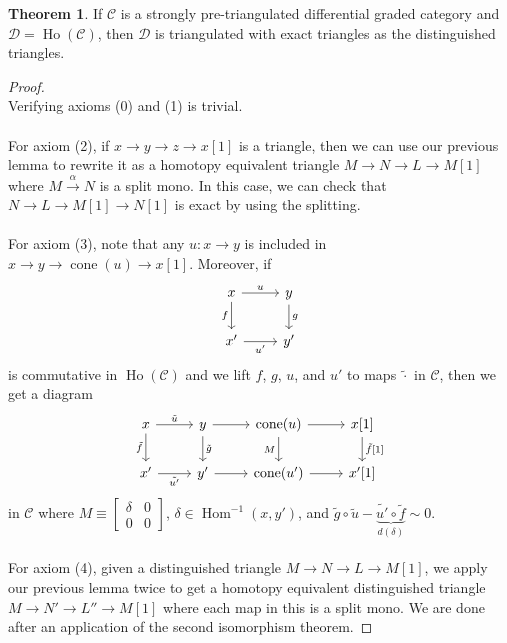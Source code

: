\documentclass[10pt,letterpaper,cm]{nupset}
\theoremstyle{definition}
\newtheorem{theorem}{Theorem}
\newcommand{\1}{\mathbf{1}}
\renewcommand{\c}{\mathscr{C}}
\renewcommand{\d}{\mathscr{D}}
\newcommand{\0}{\vec 0}
\DeclareMathOperator{\Hom}{Hom}
\DeclareMathOperator{\cone}{cone}
\DeclareMathOperator{\ho}{Ho}
\begin{document}
\begin{theorem}
If $\c$ is a strongly pre-triangulated differential graded category and $\d = \ho(\c)$, then $\d$ is triangulated with exact triangles as the distinguished triangles. 
\end{theorem}
\begin{proof} $ $
\\
Verifying axioms (0) and (1) is trivial. 
\\ \\ For axiom (2), if $x \to y \to z \to x[1]$ is a triangle, then we can use our previous lemma to rewrite it as a homotopy equivalent triangle $M \to N \to L \to M[1]$ where $M \overset{\alpha}{\longrightarrow} N$ is a split mono. In this case, we can check that $N \to L \to M[1] \to N[1]$ is exact by using the splitting. 
\\ \\ For axiom (3), note that any $u : x \to y$ is included in $x \to y \to \cone(u) \to x[1]$. Moreover, if
\[
\begin{tikzcd}
x \arrow[r, "u"] \arrow[d, "f"'] & y \arrow[d, "g"] \\
x' \arrow[r, "u'"']              & y'              
\end{tikzcd}
\]
is commutative in $\ho(\c)$ and we lift $f$, $g$, $u$, and $u'$ to maps $\tilde{\cdot}$ in $\c$, then we get  a  diagram
\[
\begin{tikzcd}
x \arrow[r, "\tilde{u}"] \arrow[d, "\tilde{f}"'] & y \arrow[d, "\tilde{g}"] \arrow[r] & \cone(u) \arrow[d, "M"'] \arrow[r] & {x[1]} \arrow[d, "{\tilde{f}[1]}"] \\
x' \arrow[r, "\tilde{u'}"']                      & y' \arrow[r]                       & \cone(u') \arrow[r]                & {x'[1]}                           
\end{tikzcd}
\]
in $\c$ where $M \equiv \begin{bmatrix} \delta & 0 \\ 0 & 0 \end{bmatrix}$, $\delta \in \Hom^{-1}(x,y')$, and  $\tilde{g} \circ \tilde{u} - \underbrace{\tilde{u'} \circ \tilde{f}}_{d(\delta)} \sim 0.$
\\ \\ For axiom (4), given a distinguished triangle $M \to N \to L \to M[1]$, we apply our previous lemma twice to   get a homotopy equivalent distinguished triangle $M \to N' \to L'' \to M[1]$ where each map in this is a split mono.  We are done after an application of the second isomorphism theorem.
\end{proof}
\end{document}
